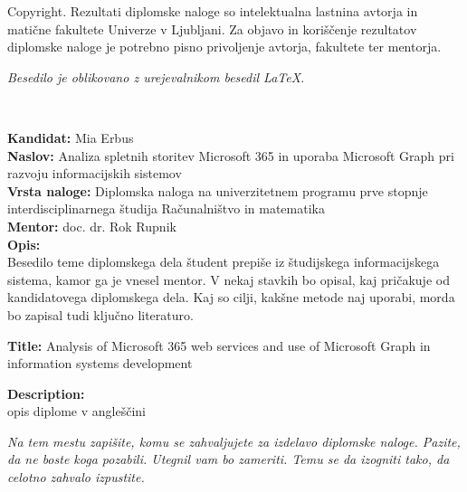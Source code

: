 \documentclass[a4paper, 12pt]{book}
\newcommand{\clearemptydoublepage}{\newpage{\pagestyle{empty}\cleardoublepage}}
\begin{document}
\thispagestyle{empty}
\vspace*{8cm}

\noindent
{\sc Copyright}. 
Rezultati diplomske naloge so intelektualna lastnina avtorja in matične fakultete Univerze v Ljubljani.
Za objavo in koriščenje rezultatov diplomske naloge je potrebno pisno privoljenje avtorja, fakultete ter mentorja.

\begin{center}
\mbox{}\vfill
\emph{Besedilo je oblikovano z urejevalnikom besedil \LaTeX.}
\end{center}
\clearemptydoublepage

\thispagestyle{empty}
\
\vfill

\bigskip
\noindent\textbf{Kandidat:} Mia Erbus\\
\noindent\textbf{Naslov:} Analiza spletnih storitev Microsoft 365 in uporaba Microsoft Graph pri razvoju informacijskih sistemov\\
\noindent\textbf{Vrsta naloge:} Diplomska naloga na univerzitetnem programu prve stopnje interdisciplinarnega študija Računalništvo in matematika \\
\noindent\textbf{Mentor:} doc. dr. Rok Rupnik\\

\bigskip
\noindent\textbf{Opis:}\\
Besedilo teme diplomskega dela študent prepiše iz študijskega informacijskega sistema, kamor ga je vnesel mentor. 
V nekaj stavkih bo opisal, kaj pričakuje od kandidatovega diplomskega dela. 
Kaj so cilji, kakšne metode naj uporabi, morda bo zapisal tudi ključno literaturo.

\bigskip
\noindent\textbf{Title:} Analysis of Microsoft 365 web services and use of Microsoft Graph in information systems development

\bigskip
\noindent\textbf{Description:}\\
opis diplome v angleščini

\vfill



\vspace{2cm}

\clearemptydoublepage

\thispagestyle{empty}\mbox{}\vfill\null\it%
\noindent
Na tem mestu zapišite, komu se zahvaljujete za izdelavo diplomske naloge. Pazite, da ne boste koga pozabili. Utegnil vam bo zameriti. Temu se da izogniti tako, da celotno zahvalo izpustite.
\rm\normalfont
\end{document}
